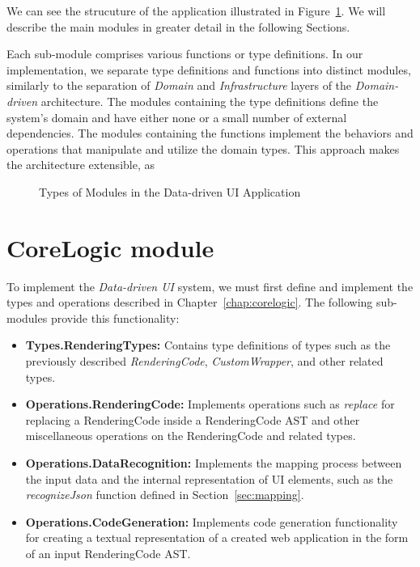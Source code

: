 We can see the strucuture of the application illustrated in Figure~\ref{fig:architecture}.
We will describe the main modules in greater detail in the following Sections.

Each sub-module comprises various functions or type definitions.
In our implementation, we separate type definitions and functions into distinct modules, similarly to the separation of \emph{Domain} and \emph{Infrastructure} layers of the \emph{Domain-driven} architecture.
The modules containing the type definitions define the system's domain and have either none or a small number of external dependencies.
The modules containing the functions implement the behaviors and operations that manipulate and utilize the domain types.
This approach makes the architecture extensible, as
\begin{figure}[htbp]
	\centering
	\caption{Types of Modules in the Data-driven UI Application}
	\label{fig:architecture}
\end{figure}


\section{CoreLogic module}
To implement the \emph{Data-driven UI} system, we must first define and implement the types and operations described in Chapter~\ref{chap:corelogic}.
The following sub-modules provide this functionality:
\begin{itemize}
	\item \textbf{Types.RenderingTypes:} Contains type definitions of types such as the previously described \emph{RenderingCode}, \emph{CustomWrapper}, and other related types.
	\item \textbf{Operations.RenderingCode:} Implements operations such as \emph{replace} for replacing a RenderingCode inside a RenderingCode AST and other miscellaneous operations on the RenderingCode and related types.
	\item \textbf{Operations.DataRecognition:} Implements the mapping process between the input data and the internal representation of UI elements, such as the \emph{recognizeJson} function defined in Section~\ref{sec:mapping}.
	\item \textbf{Operations.CodeGeneration:} Implements code generation functionality for creating a textual representation of a created web application in the form of an input RenderingCode AST.
\end{itemize}


